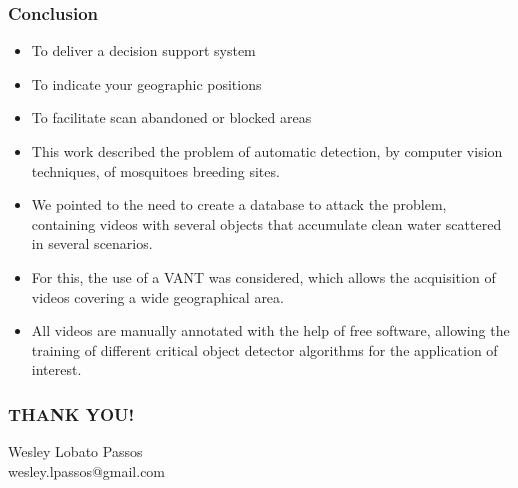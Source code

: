 \documentclass{beamer}
\begin{document}
		\begin{frame}
			\frametitle{Conclusion}
			\begin{itemize}
				\item To deliver a decision support system
				\item To indicate your geographic positions
				\item To facilitate scan abandoned or blocked areas
			\end{itemize}

		\begin{itemize}
			\item This work described the problem of automatic detection, by computer vision techniques, of mosquitoes breeding sites.
			\item We pointed to the need to create a database to attack the problem, containing videos with several objects that accumulate clean water scattered in several scenarios.
			\item For this, the use of a VANT was considered, which allows the acquisition of videos covering a wide geographical area.
			\item All videos are manually annotated with the help of free software, allowing the training of different critical object detector algorithms for the application of interest.
		\end{itemize}

		\end{frame}

		\begin{frame}
			\frametitle{THANK YOU!}
			\centering
			Wesley Lobato Passos\\
			wesley.lpassos@gmail.com
		\end{frame}
\end{document}
